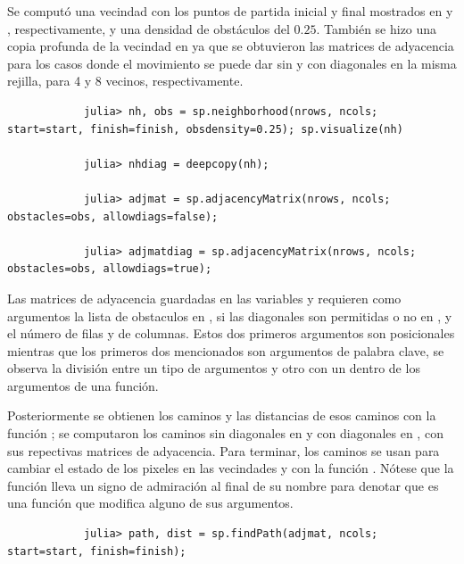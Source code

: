 \begin{enumerate}
\begin{solution}
        Se computó una vecindad con los puntos de partida inicial y final mostrados en  y , respectivamente, y una densidad de obstáculos del $0.25$. También se hizo una copia profunda de la vecindad  en  ya que se obtuvieron las matrices de adyacencia para los casos donde el movimiento se puede dar sin y con diagonales en la misma rejilla, para 4 y 8 vecinos, respectivamente.
        \begin{verbatim}
            julia> nh, obs = sp.neighborhood(nrows, ncols; start=start, finish=finish, obsdensity=0.25); sp.visualize(nh)

            julia> nhdiag = deepcopy(nh);

            julia> adjmat = sp.adjacencyMatrix(nrows, ncols; obstacles=obs, allowdiags=false);

            julia> adjmatdiag = sp.adjacencyMatrix(nrows, ncols; obstacles=obs, allowdiags=true);
        \end{verbatim}

        Las matrices de adyacencia guardadas en las variables  y  requieren como argumentos la lista de obstaculos en , si las diagonales son permitidas o no en , y el número de filas y de columnas. Estos dos primeros argumentos son posicionales mientras que los primeros dos mencionados son argumentos de palabra clave, se observa la división entre un tipo de argumentos y otro con un \code{;} dentro de los argumentos de una función.

        Posteriormente se obtienen los caminos y las distancias de esos caminos con la función ; se computaron los caminos sin diagonales en  y con diagonales en , con sus repectivas matrices de adyacencia. Para terminar, los caminos se usan para cambiar el estado de los pixeles en las vecindades  y  con la función . Nótese que la función lleva un signo de admiración \code{!} al final de su nombre para denotar que es una función que modifica alguno de sus argumentos.
        \begin{verbatim}
            julia> path, dist = sp.findPath(adjmat, ncols; start=start, finish=finish);


\end{verbatim}
\end{solution}
\end{enumerate}
